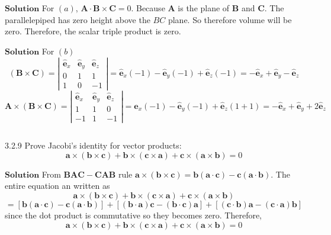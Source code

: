 $\boxed{\textbf{Solution}}$ For $(a)$, $\mathbf{A} \cdot \mathbf{B} \times \mathbf{C}=0 .$ Because $\mathbf{A}$ is the plane of $\mathbf{B}$ and $\mathbf{C}$. The parallelepiped has zero height above the $BC$ plane. So therefore volume will be zero.
Therefore, the scalar triple product is zero.




$\boxed{\textbf{Solution}}$ For $(b)$ 
$$
(\mathbf{B} \times \mathbf{C})=\left|\begin{array}{ccc}
\hat{\mathbf{e}}_{x} & \hat{\mathbf{e}}_{y} & \hat{\mathbf{e}}_{z} \\
0 & 1 & 1 \\
1 & 0 & -1
\end{array}\right|=\hat{\mathbf{e}}_{x}(-1)-\hat{\mathbf{e}}_{y}(-1)+\hat{\mathbf{e}}_{z}(-1)=-\hat{\mathbf{e}}_{x}+\hat{\mathbf{e}}_{y}-\hat{\mathbf{e}}_{z}
$$
$$
\mathbf{A} \times(\mathbf{B} \times \mathbf{C})=\left|\begin{array}{ccc}
\hat{\mathbf{e}}_{x} & \hat{\mathbf{e}}_{y} & \hat{\mathbf{e}}_{z} \\
1 & 1 & 0 \\
-1 & 1 & -1
\end{array}\right|=\hat{\mathbf{e}}_{x}(-1)-\hat{\mathbf{e}}_{y}(-1)+\hat{\mathbf{e}}_{z}(1+1)=-\hat{\mathbf{e}}_{x}+\hat{\mathbf{e}}_{y}+2 \hat{\mathbf{e}}_{z}
$$


$$$$

\begin{mybox}{3.2.9}
Prove Jacobi's identity for vector products:
$$
\mathbf{a} \times(\mathbf{b} \times \mathbf{c})+\mathbf{b} \times(\mathbf{c} \times \mathbf{a})+\mathbf{c} \times(\mathbf{a} \times \mathbf{b})=0
$$
\end{mybox}


$\boxed{\textbf{Solution}}$ From $\mathbf{BA}\mathbf{C}-\mathbf{C}\mathbf{AB}$ rule $\mathbf{a}\times(\mathbf{b} \times \mathbf{c})=\mathbf{b}(\mathbf{a}\cdot \mathbf{c})-\mathbf{c}(\mathbf{a} \cdot \mathbf{b}).$ The entire equation an written as
$$
\mathbf{a}\times(\mathbf{b} \times \mathbf{c})+\mathbf{b} \times(\mathbf{c} \times \mathbf{a})+\mathbf{c} \times(\mathbf{a} \times \mathbf{b})$$
$$=[\mathbf{b}(\mathbf{a} \cdot \mathbf{c})-\mathbf{c}(\mathbf{a} \cdot \mathbf{b})]+[(\mathbf{b} \cdot \mathbf{a}) \mathbf{c}-(\mathbf{b} \cdot \mathbf{c}) \mathbf{a}]+[(\mathbf{c} \cdot \mathbf{b}) \mathbf{a}-(\mathbf{c} \cdot \mathbf{a}) \mathbf{b}]
$$
since the dot product is commutative so they becomes zero.
Therefore, $$ \mathbf{a}\times(\mathbf{b} \times \mathbf{c})+\mathbf{b} \times(\mathbf{c} \times \mathbf{a})+\mathbf{c} \times(\mathbf{a} \times \mathbf{b})=0$$


